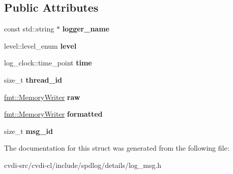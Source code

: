 \subsection*{Public Attributes}
\begin{DoxyCompactItemize}
\item 
const std\+::string $\ast$ {\bfseries logger\+\_\+name}\hypertarget{structspdlog_1_1details_1_1log__msg_a0aacbf01e2a67660d328fa2080d55def}{}\label{structspdlog_1_1details_1_1log__msg_a0aacbf01e2a67660d328fa2080d55def}

\item 
level\+::level\+\_\+enum {\bfseries level}\hypertarget{structspdlog_1_1details_1_1log__msg_a4142f4d66140a1ea24053311ebea5706}{}\label{structspdlog_1_1details_1_1log__msg_a4142f4d66140a1ea24053311ebea5706}

\item 
log\+\_\+clock\+::time\+\_\+point {\bfseries time}\hypertarget{structspdlog_1_1details_1_1log__msg_a25fadb26e6ce94657af5475d4a581313}{}\label{structspdlog_1_1details_1_1log__msg_a25fadb26e6ce94657af5475d4a581313}

\item 
size\+\_\+t {\bfseries thread\+\_\+id}\hypertarget{structspdlog_1_1details_1_1log__msg_ab8474cd689276f61021bca37e1993eef}{}\label{structspdlog_1_1details_1_1log__msg_ab8474cd689276f61021bca37e1993eef}

\item 
\hyperlink{classfmt_1_1BasicMemoryWriter}{fmt\+::\+Memory\+Writer} {\bfseries raw}\hypertarget{structspdlog_1_1details_1_1log__msg_a4408eab696be1086d11e351184ecc68c}{}\label{structspdlog_1_1details_1_1log__msg_a4408eab696be1086d11e351184ecc68c}

\item 
\hyperlink{classfmt_1_1BasicMemoryWriter}{fmt\+::\+Memory\+Writer} {\bfseries formatted}\hypertarget{structspdlog_1_1details_1_1log__msg_a20b83810adf6cfaf73fd2e7b42c3016c}{}\label{structspdlog_1_1details_1_1log__msg_a20b83810adf6cfaf73fd2e7b42c3016c}

\item 
size\+\_\+t {\bfseries msg\+\_\+id}\hypertarget{structspdlog_1_1details_1_1log__msg_a8cbec91cdecd3cb4efe9cfa39d5d1d84}{}\label{structspdlog_1_1details_1_1log__msg_a8cbec91cdecd3cb4efe9cfa39d5d1d84}

\end{DoxyCompactItemize}


The documentation for this struct was generated from the following file\+:\begin{DoxyCompactItemize}
\item 
cvdi-\/src/cvdi-\/cl/include/spdlog/details/log\+\_\+msg.\+h\end{DoxyCompactItemize}
